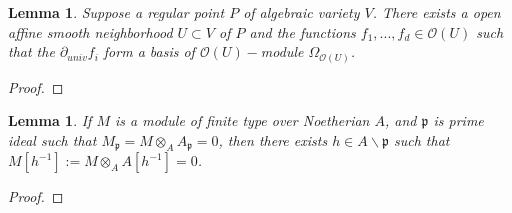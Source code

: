 \documentclass[12pt,a4paper,english]{article}
\theoremstyle{plain}
\newtheorem{lem}[thm]{Lemma}
\theoremstyle{definition}
\theoremstyle{remark}
\begin{document}
\begin{lem}
Suppose a regular point $P$ of algebraic variety $V$. There exists a open affine smooth neighborhood $U\subset V$ of $P$ and the functions $f_{1},...,f_{d}\in\mathcal{O}(U)$ such that the $\partial_{univ}f_{i}$ form a basis of $\mathcal{O}(U)-$module $\Omega_{\mathcal{O}(U)}$. 
\end{lem}
\begin{proof}

\end{proof}
\begin{lem}
If $M$ is a module of finite type over Noetherian $A$, and $\mathfrak{p}$ is prime ideal such that $M_{\mathfrak{p}}=M\otimes_{A}A_{\mathfrak{p}}=0$, then there exists $h\in A\backslash\mathfrak{p}$ such that $M[h^{-1}]:=M\otimes_{A} A[h^{-1}]=0$.
\end{lem}
\begin{proof}


\end{proof}
\end{document}
